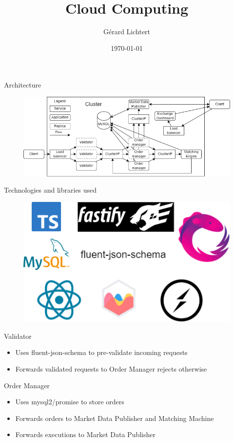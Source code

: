 \documentclass{beamer}
\title{Cloud Computing}
\date{\today}
\author{Gérard Lichtert}
\begin{document}
\frame{\maketitle} %
\begin{frame}{Architecture}
	\begin{figure}
		\includegraphics[width=\textwidth]{architecture.drawio.png}
	\end{figure}
\end{frame}
\begin{frame}{Technologies and libraries used}
	\begin{figure}
		\includegraphics[width=\textwidth]{technologies.drawio.png}
	\end{figure}
\end{frame}
\begin{frame}{Validator}
	\begin{itemize}
		\item Uses fluent-json-schema to pre-validate incoming requests
		\item Forwards validated requests to Order Manager rejects otherwise
	\end{itemize}
\end{frame}
\begin{frame}{Order Manager}
	\begin{itemize}
		\item Uses mysql2/promise to store orders
		\item Forwards orders to Market Data Publisher and Matching Machine
		\item Forwards executions to Market Data Publisher
	\end{itemize}
\end{frame}
\end{document}
